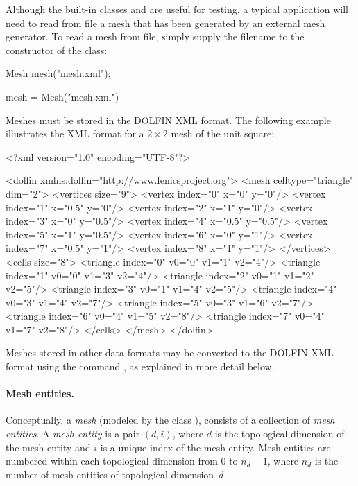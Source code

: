 Although the built-in classes  and 
are useful for testing, a typical application will need to read from
file a mesh that has been generated by an external mesh generator. To read
a mesh from file, simply supply the filename to the constructor of the
 class:
\begin{c++}
Mesh mesh("mesh.xml");
\end{c++}
\begin{python}
mesh = Mesh("mesh.xml")
\end{python}
Meshes must be stored in the DOLFIN XML format. The following example
illustrates the XML format for a $2 \times 2$ mesh of the unit square:

\begin{xml}
<?xml version="1.0" encoding="UTF-8"?>

<dolfin xmlns:dolfin="http://www.fenicsproject.org">
  <mesh celltype="triangle" dim="2">
    <vertices size="9">
      <vertex index="0" x="0" y="0"/>
      <vertex index="1" x="0.5" y="0"/>
      <vertex index="2" x="1" y="0"/>
      <vertex index="3" x="0" y="0.5"/>
      <vertex index="4" x="0.5" y="0.5"/>
      <vertex index="5" x="1" y="0.5"/>
      <vertex index="6" x="0" y="1"/>
      <vertex index="7" x="0.5" y="1"/>
      <vertex index="8" x="1" y="1"/>
    </vertices>
    <cells size="8">
      <triangle index="0" v0="0" v1="1" v2="4"/>
      <triangle index="1" v0="0" v1="3" v2="4"/>
      <triangle index="2" v0="1" v1="2" v2="5"/>
      <triangle index="3" v0="1" v1="4" v2="5"/>
      <triangle index="4" v0="3" v1="4" v2="7"/>
      <triangle index="5" v0="3" v1="6" v2="7"/>
      <triangle index="6" v0="4" v1="5" v2="8"/>
      <triangle index="7" v0="4" v1="7" v2="8"/>
    </cells>
  </mesh>
</dolfin>
\end{xml}
Meshes stored in other data formats may be converted to the DOLFIN XML
format using the command , as explained in more
detail below.

\paragraph{Mesh entities.}

Conceptually, a \emph{mesh} (modeled by the class ), consists of
a collection of \emph{mesh entities}.  A \emph{mesh entity} is a pair $(d,
i)$, where $d$ is the topological dimension of the mesh entity and $i$
is a unique index of the mesh entity. Mesh entities are numbered within
each topological dimension from $0$ to $n_d-1$, where $n_d$ is the number
of mesh entities of topological dimension~$d$.

